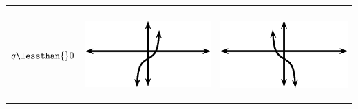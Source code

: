 \begin{center}
\begin{xtabular*}{\mytablewidth}[t]{|p{10\mystarwidth}|p{10\mystarwidth}|p{10\mystarwidth}|}
\begin{center}
\vspace{2pt}
\vspace{.1in}
\end{center}    
\tabularnewline{}
    $q\lessthan{}0$
    &
\setcounter{subfigure}{0}
\label{m39414*id91030}
\begin{center}
\label{m39414*id91030!!!underscore!!!media}\label{m39414*id91030!!!underscore!!!printimage}\includegraphics{col11306.imgs/m39414_MG10C15_036.png} %
\vspace{2pt}
\vspace{.1in}
\end{center}    
    &
\setcounter{subfigure}{0}
\label{m39414*id91042}
\begin{center}
\label{m39414*id91042!!!underscore!!!media}\label{m39414*id91042!!!underscore!!!printimage}\includegraphics[width=300px]{col11306.imgs/m39414_MG10C15_037.png} %
\vspace{2pt}
\vspace{.1in}
\end{center}    
\tabularnewline{}
\end{xtabular*}
\end{center}
